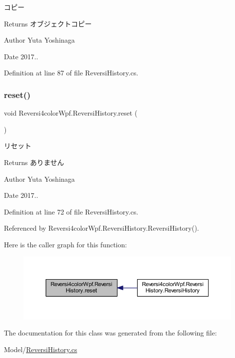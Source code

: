 コピー 

\begin{DoxyReturn}{Returns}
オブジェクトコピー 
\end{DoxyReturn}
\begin{DoxyAuthor}{Author}
Yuta Yoshinaga 
\end{DoxyAuthor}
\begin{DoxyDate}{Date}
2017.. 
\end{DoxyDate}


Definition at line 87 of file Reversi\+History.\+cs.

\mbox{\label{class_reversi4color_wpf_1_1_reversi_history_aef56b272c0318b4b63ec22714c3d4c67}} 
\subsubsection{\texorpdfstring{reset()}{reset()}}
{\footnotesize\ttfamily void Reversi4color\+Wpf.\+Reversi\+History.\+reset (\begin{DoxyParamCaption}{ }\end{DoxyParamCaption})}



リセット 

\begin{DoxyReturn}{Returns}
ありません 
\end{DoxyReturn}
\begin{DoxyAuthor}{Author}
Yuta Yoshinaga 
\end{DoxyAuthor}
\begin{DoxyDate}{Date}
2017.. 
\end{DoxyDate}


Definition at line 72 of file Reversi\+History.\+cs.



Referenced by Reversi4color\+Wpf.\+Reversi\+History.\+Reversi\+History().

Here is the caller graph for this function\+:
\nopagebreak
\begin{figure}[H]
\begin{center}
\leavevmode
\includegraphics[width=350pt]{class_reversi4color_wpf_1_1_reversi_history_aef56b272c0318b4b63ec22714c3d4c67_icgraph}
\end{center}
\end{figure}


The documentation for this class was generated from the following file\+:\begin{DoxyCompactItemize}
\item 
Model/\hyperlink{_reversi_history_8cs}{Reversi\+History.\+cs}\end{DoxyCompactItemize}
